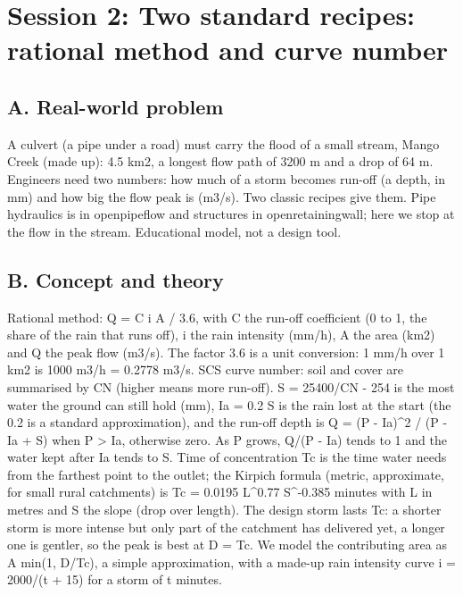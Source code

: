 \documentclass[11pt,a4paper]{article}
\begin{document}
\section{Session 2: Two standard recipes: rational method and curve number}

\subsection*{A. Real-world problem}
A culvert (a pipe under a road) must carry the flood of a small stream, Mango Creek (made up): 4.5 km2, a longest flow path of 3200 m and a drop of 64 m. Engineers need two numbers: how much of a storm becomes run-off (a depth, in mm) and how big the flow peak is (m3/s). Two classic recipes give them. Pipe hydraulics is in openpipeflow and structures in openretainingwall; here we stop at the flow in the stream. Educational model, not a design tool.

\subsection*{B. Concept and theory}
Rational method: Q = C i A / 3.6, with C the run-off coefficient (0 to 1, the share of the rain that runs off), i the rain intensity (mm/h), A the area (km2) and Q the peak flow (m3/s). The factor 3.6 is a unit conversion: 1 mm/h over 1 km2 is 1000 m3/h = 0.2778 m3/s. SCS curve number: soil and cover are summarised by CN (higher means more run-off). S = 25400/CN - 254 is the most water the ground can still hold (mm), Ia = 0.2 S is the rain lost at the start (the 0.2 is a standard approximation), and the run-off depth is Q = (P - Ia)\textasciicircum{}2 / (P - Ia + S) when P \textgreater{} Ia, otherwise zero. As P grows, Q/(P - Ia) tends to 1 and the water kept after Ia tends to S. Time of concentration Tc is the time water needs from the farthest point to the outlet; the Kirpich formula (metric, approximate, for small rural catchments) is Tc = 0.0195 L\textasciicircum{}0.77 S\textasciicircum{}-0.385 minutes with L in metres and S the slope (drop over length). The design storm lasts Tc: a shorter storm is more intense but only part of the catchment has delivered yet, a longer one is gentler, so the peak is best at D = Tc. We model the contributing area as A min(1, D/Tc), a simple approximation, with a made-up rain intensity curve i = 2000/(t + 15) for a storm of t minutes.
\end{document}

